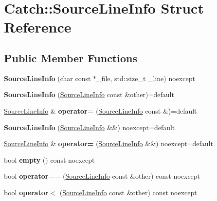\hypertarget{structCatch_1_1SourceLineInfo}{}\section{Catch\+:\+:Source\+Line\+Info Struct Reference}
\label{structCatch_1_1SourceLineInfo}
\subsection*{Public Member Functions}
\begin{DoxyCompactItemize}
\item 
\mbox{\label{structCatch_1_1SourceLineInfo_a48510b82a39a042ab370ed143dd30c10}} 
{\bfseries Source\+Line\+Info} (char const $\ast$\+\_\+file, std\+::size\+\_\+t \+\_\+line) noexcept
\item 
\mbox{\label{structCatch_1_1SourceLineInfo_a7c44c9986c33a9cf842b791374332d41}} 
{\bfseries Source\+Line\+Info} (\hyperlink{structCatch_1_1SourceLineInfo}{Source\+Line\+Info} const \&other)=default
\item 
\mbox{\label{structCatch_1_1SourceLineInfo_a1a6cfc0197357ef4e329bb256aa8a354}} 
\hyperlink{structCatch_1_1SourceLineInfo}{Source\+Line\+Info} \& {\bfseries operator=} (\hyperlink{structCatch_1_1SourceLineInfo}{Source\+Line\+Info} const \&)=default
\item 
\mbox{\label{structCatch_1_1SourceLineInfo_a5ea6179645457b8ec961aec9ca4c5588}} 
{\bfseries Source\+Line\+Info} (\hyperlink{structCatch_1_1SourceLineInfo}{Source\+Line\+Info} \&\&) noexcept=default
\item 
\mbox{\label{structCatch_1_1SourceLineInfo_ab8469b89d86bdd69b6b9f2b610600258}} 
\hyperlink{structCatch_1_1SourceLineInfo}{Source\+Line\+Info} \& {\bfseries operator=} (\hyperlink{structCatch_1_1SourceLineInfo}{Source\+Line\+Info} \&\&) noexcept=default
\item 
\mbox{\label{structCatch_1_1SourceLineInfo_a10a5b5b7dff82971879c2eb8d83f9b3b}} 
bool {\bfseries empty} () const noexcept
\item 
\mbox{\label{structCatch_1_1SourceLineInfo_af07e4fdeddf8409b91e4f842f6264cf8}} 
bool {\bfseries operator==} (\hyperlink{structCatch_1_1SourceLineInfo}{Source\+Line\+Info} const \&other) const noexcept
\item 
\mbox{\label{structCatch_1_1SourceLineInfo_af77415416919d2d6030b4be085b92f7a}} 
bool {\bfseries operator$<$} (\hyperlink{structCatch_1_1SourceLineInfo}{Source\+Line\+Info} const \&other) const noexcept
\end{DoxyCompactItemize}
